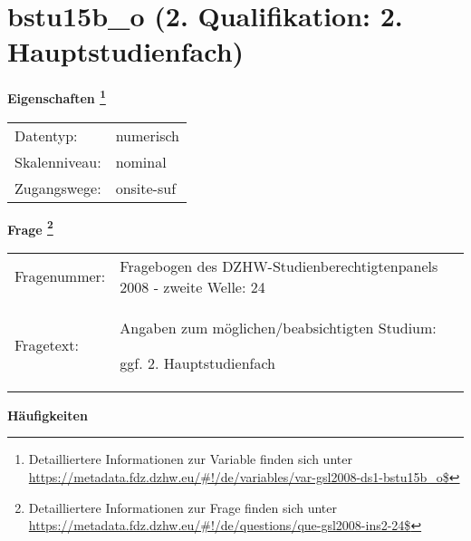 
    \setcounter{footnote}{0}

    \vspace*{-1.8cm}
	\section{bstu15b\_o (2. Qualifikation: 2. Hauptstudienfach)}
	\label{section:bstu15b_o}



    \vspace*{0.5cm}
    \noindent\textbf{Eigenschaften
	\footnote{Detailliertere Informationen zur Variable finden sich unter
		\url{https://metadata.fdz.dzhw.eu/\#!/de/variables/var-gsl2008-ds1-bstu15b_o$}}}\\
	\begin{tabularx}{\hsize}{@{}lX}
	Datentyp: & numerisch \\
	Skalenniveau: & nominal \\
	Zugangswege: &
	  onsite-suf
 \\
    \end{tabularx}



				\vspace*{0.5cm}
                \noindent\textbf{Frage
	                \footnote{Detailliertere Informationen zur Frage finden sich unter
		              \url{https://metadata.fdz.dzhw.eu/\#!/de/questions/que-gsl2008-ins2-24$}}}\\
				\begin{tabularx}{\hsize}{@{}lX}
					Fragenummer: &
					  Fragebogen des DZHW-Studienberechtigtenpanels 2008 - zweite Welle:
					  24
 \\
					Fragetext: & Angaben zum möglichen/beabsichtigten Studium:\par  ggf. 2. Hauptstudienfach \\
				\end{tabularx}





        		\vspace*{0.5cm}
                \noindent\textbf{Häufigkeiten}

